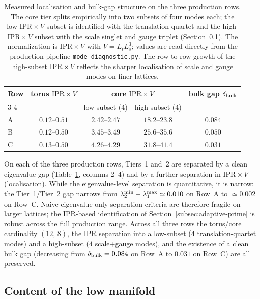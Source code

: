 \documentclass[a4paper,11pt]{article}
\theoremstyle{definition}
\begin{document}
\begin{table}[h]
\centering
\begin{tabular}{lcccc}
\toprule
Row & torus $\mathrm{IPR}\!\times\!V$ &
\multicolumn{2}{c}{core $\mathrm{IPR}\!\times\!V$} &
bulk gap $\delta_{\rm bulk}$ \\
\cmidrule(lr){3-4}
 & & low subset (4) & high subset (4) & \\
\midrule
A & $0.12$--$0.51$ & $2.42$--$2.47$ & $18.2$--$23.8$ & $0.084$ \\
B & $0.12$--$0.50$ & $3.45$--$3.49$ & $25.6$--$35.6$ & $0.050$ \\
C & $0.13$--$0.50$ & $4.26$--$4.29$ & $31.8$--$41.4$ & $0.031$ \\
\bottomrule
\end{tabular}
\caption{Measured localisation and bulk-gap structure on the three
production rows. The core tier splits empirically into two subsets of
four modes each; the low-$\mathrm{IPR}\!\times\!V$ subset is identified
with the translation quartet and the high-$\mathrm{IPR}\!\times\!V$ subset
with the scale singlet and gauge triplet (Section~\ref{subsec:V20-content}).
The normalization is $\mathrm{IPR}\!\times\!V$ with $V = L_t L_s^3$;
values are read directly from the production pipeline
\texttt{mode\_diagnostic.py}. The row-to-row growth of the high-subset
$\mathrm{IPR}\!\times\!V$ reflects the sharper localisation of scale and
gauge modes on finer lattices.}
\label{tab:three-tier-summary}
\end{table}

On each of the three production rows, Tiers~1 and~2 are separated by
a clean eigenvalue gap (Table~\ref{tab:three-tier-summary}, columns
2--4) and by a further separation in $\mathrm{IPR}\!\times\!V$
(localisation). While the eigenvalue-level separation is quantitative,
it is narrow: the Tier~1/Tier~2 gap narrows from $\lambda_2^{\rm min}
- \lambda_1^{\rm max} \simeq 0.010$ on Row~A to $\simeq 0.002$ on
Row~C. Naive eigenvalue-only separation criteria are therefore
fragile on larger lattices; the IPR-based identification of
Section~\ref{subsec:adaptive-prime} is robust across the full production
range. Across all three rows the torus/core cardinality $(12,\,8)$,
the IPR separation into a low-subset ($4$ translation-quartet modes)
and a high-subset ($4$ scale+gauge modes), and the existence of a
clean bulk gap (decreasing from $\delta_{\rm bulk} = 0.084$ on Row~A
to $0.031$ on Row~C) are all preserved.

\subsection{Content of the low manifold}
\label{subsec:V20-content}
\end{document}
